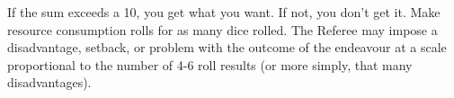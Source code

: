 \documentclass[landscape]{book}
\begin{document}
\begin{multicols*}{4}
  If the sum exceeds a 10, you get what you want. If not, you don't get it. Make resource consumption rolls for as many dice rolled. The Referee may impose a disadvantage, setback, or problem with the outcome of the endeavour at a scale proportional to the number of 4-6 roll results (or more simply, that many disadvantages). 


  
\end{multicols*}
\end{document}
